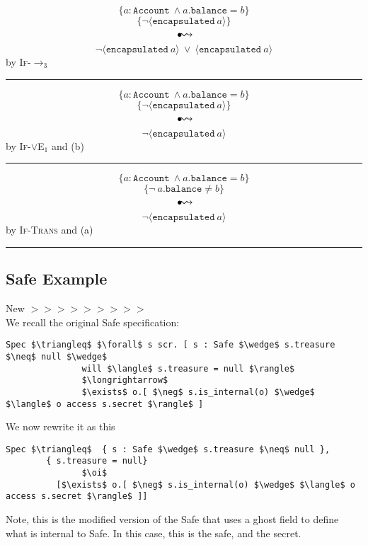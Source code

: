 \documentclass[12pt]{article}
\newcommand\trans{\mathlarger{\mathlarger \leadsto}}
\newcommand\oi{\hspace{1mm}{\raisebox{1pt}{$\bullet$}}\hspace{-1mm}{\trans}}
\newcommand\encapsulated[1]{\langle \texttt{encapsulated}\ #1 \rangle}
\numberwithin{case}{lemma}
\numberwithin{case}{theorem}
\numberwithin{subcase}{case}
\begin{document}
$$
	\{a : \texttt{Account}\ \wedge a.\texttt{balance} = b\}
$$
$$
	\{\neg \encapsulated{a}\}
$$
$$\oi$$
$$
	{\neg \encapsulated{a}\ \vee\ \encapsulated{a}}
$$
\hfill by \textsc{If-$\longrightarrow_3$}
\hrule
\vspace{3mm}
$$
	\{a : \texttt{Account}\ \wedge a.\texttt{balance} = b\}
$$
$$
	\{\neg \encapsulated{a}\}
$$
$$\oi$$
$$
	{\neg\encapsulated{a}}
$$
\hfill by \textsc{If-$\vee$E$_1$} and (b)
\hrule
\vspace{3mm}
$$
	\{a : \texttt{Account}\ \wedge a.\texttt{balance} = b\}
$$
$$
	\{\neg\ a.\texttt{balance} \neq b\}
$$
$$\oi$$
$$
	{\neg\encapsulated{a}}
$$
\hfill by \textsc{If-Trans} and (a)
\hrule
\vspace{3mm}
\normalsize

\newpage

\subsection{Safe Example}
{\color{Green} New $>>>>>>>>>$}\\
We recall the original Safe specification:
\begin{lstlisting}[mathescape=true]
Spec $\triangleq$ $\forall$ s scr. [ s : Safe $\wedge$ s.treasure $\neq$ null $\wedge$
               will $\langle$ s.treasure = null $\rangle$
               $\longrightarrow$
               $\exists$ o.[ $\neg$ s.is_internal(o) $\wedge$ $\langle$ o access s.secret $\rangle$ ]
\end{lstlisting}
We now rewrite it as this
\begin{lstlisting}[mathescape=true]
Spec $\triangleq$  { s : Safe $\wedge$ s.treasure $\neq$ null },
        { s.treasure = null}
               $\oi$
          [$\exists$ o.[ $\neg$ s.is_internal(o) $\wedge$ $\langle$ o access s.secret $\rangle$ ]]
\end{lstlisting}
Note, this is the modified version of the Safe that uses a ghost field to define what is internal to Safe. 
In this case, this is the safe, and the secret.
\end{document}

